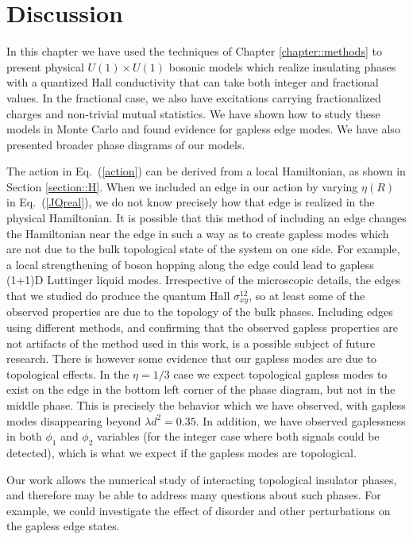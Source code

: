 \section{Discussion}
In this chapter we have used the techniques of Chapter \ref{chapter::methods} to present physical $U(1) \times U(1)$ bosonic models which realize insulating phases with a quantized Hall conductivity that can take both integer and fractional values. 
In the fractional case, we also have excitations carrying fractionalized charges and non-trivial mutual statistics. We have shown how to study these models in Monte Carlo and found evidence for gapless edge modes. We have also presented broader phase diagrams of our models.

The action in Eq.~(\ref{action}) can be derived from a local Hamiltonian, as shown in Section \ref{section::H}. When we included an edge in our action by varying $\eta(R)$ in Eq.~(\ref{JQreal}), we do not know precisely how that edge is realized in the physical Hamiltonian. It is possible that this method of including an edge changes the Hamiltonian near the edge in such a way as to create gapless modes which are not due to the bulk topological state of the system on one side.  For example, a local strengthening of boson hopping along the edge could lead to gapless (1+1)D Luttinger liquid modes.  Irrespective of the microscopic details, the edges that we studied do produce the quantum Hall $\sigma^{12}_{xy}$, so at least some of the observed properties are due to the topology of the bulk phases.  Including edges using different methods, and confirming that the observed gapless properties are not artifacts of the method used in this work, is a possible subject of future research. There is however some evidence that our gapless modes are due to topological effects. In the $\eta=1/3$ case we expect topological gapless modes to exist on the edge in the bottom left corner of the phase diagram, but not in the middle phase. This is precisely the behavior which we have observed, with gapless modes disappearing beyond $\lambda d^2=0.35$. In addition, we have observed gaplessness in both $\phi_1$ and $\phi_2$ variables (for the integer case where both signals could be detected), which is what we expect if the gapless modes are topological.

Our work allows the numerical study of interacting topological insulator phases, and therefore may be able to address many questions about such phases. For example, we could investigate the effect of disorder and other perturbations on the gapless edge states. 


